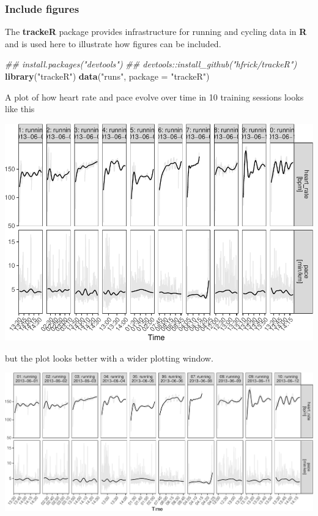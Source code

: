 \documentclass[]{book}
\newenvironment{Shaded}{\begin{snugshade}}{\end{snugshade}}
\newcommand{\CommentTok}[1]{\textcolor[rgb]{0.56,0.35,0.01}{\textit{#1}}}
\newcommand{\DataTypeTok}[1]{\textcolor[rgb]{0.13,0.29,0.53}{#1}}
\newcommand{\KeywordTok}[1]{\textcolor[rgb]{0.13,0.29,0.53}{\textbf{#1}}}
\newcommand{\NormalTok}[1]{#1}
\newcommand{\StringTok}[1]{\textcolor[rgb]{0.31,0.60,0.02}{#1}}
\begin{document}
\hypertarget{include-figures}{%
\subsubsection{Include figures}\label{include-figures}}

The \textbf{trackeR} package provides infrastructure for running and cycling data in \textbf{R} and is used here to illustrate how figures can be included.

\begin{Shaded}
\begin{Highlighting}[]
\CommentTok{## install.packages("devtools")}
\CommentTok{## devtools::install_github("hfrick/trackeR")}
\KeywordTok{library}\NormalTok{(}\StringTok{"trackeR"}\NormalTok{) }
\KeywordTok{data}\NormalTok{(}\StringTok{"runs"}\NormalTok{, }\DataTypeTok{package =} \StringTok{"trackeR"}\NormalTok{)}
\end{Highlighting}
\end{Shaded}

A plot of how heart rate and pace evolve over time in 10 training sessions looks like this

\includegraphics{code4stem_files/figure-latex/unnamed-chunk-4-1.pdf}

but the plot looks better with a wider plotting window.

\includegraphics{code4stem_files/figure-latex/unnamed-chunk-5-1.pdf}
\end{document}
